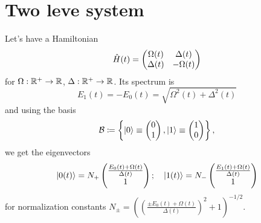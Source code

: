 \chapter{Two leve system}


Let's have a Hamiltonian
\begin{equation}
    \hat{H}(t)=\begin{pmatrix}
        \Omega(t)&\Delta(t)\\
        \Delta(t)&-\Omega(t)
    \end{pmatrix}
\end{equation}
for $\Omega: \mathbb{R}^+\rightarrow \mathbb{R}$, $\Delta: \mathbb{R}^+\rightarrow \mathbb{R}$. Its spectrum is
\begin{equation}
    E_1(t)=-E_0(t)= \sqrt{\Omega^2(t)+\Delta^2(t)}
    \label{eq:energy}
\end{equation}
and using the basis
\begin{equation}
    \mathcal{B}\coloneqq \left\{
        \ket{0}\equiv\begin{pmatrix}
            0\\1
        \end{pmatrix},
        \ket{1}\equiv\begin{pmatrix}
                1\\0
            \end{pmatrix} \right\},
\end{equation}
we get the eigenvectors 
\begin{equation}
\ket{0(t)}=N_+ \begin{pmatrix}
 \frac{E_0(t)+\Omega(t)}{\Delta(t)} \\ 1
\end{pmatrix};\quad \ket{1(t)}=N_-\begin{pmatrix}
    \frac{E_1(t)+\Omega(t)}{\Delta(t)} \\ 1
   \end{pmatrix}
   \label{eq:eigenvectors}
\end{equation}
for normalization constants $N_\pm=\left(\left(\frac{\pm E_0(t)+\Omega(t)}{\Delta(t)}\right)^2+1\right)^{-1/2}$.

